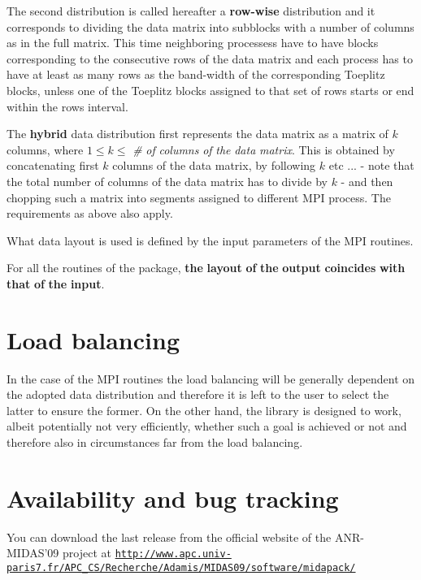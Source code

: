 The second distribution is called hereafter a {\bfseries row-\/wise} distribution and it corresponds to dividing the data matrix into subblocks with a number of columns as in the full matrix. This time neighboring processess have to have blocks corresponding to the consecutive rows of the data matrix and each process has to have at least as many rows as the band-\/width of the corresponding Toeplitz blocks, unless one of the Toeplitz blocks assigned to that set of rows starts or end within the rows interval.

The {\bfseries hybrid} data distribution first represents the data matrix as a matrix of $ k $ columns, where $ 1 \le k \le $ {\itshape \#} {\itshape of} {\itshape columns} {\itshape of} {\itshape the} {\itshape data} {\itshape matrix}. This is obtained by concatenating first $ k $ columns of the data matrix, by following $ k$ etc ... -\/ note that the total number of columns of the data matrix has to divide by $ k$ -\/ and then chopping such a matrix into segments assigned to different M\-P\-I process. The requirements as above also apply.

What data layout is used is defined by the input parameters of the M\-P\-I routines.

For all the routines of the package, {\bfseries the} {\bfseries layout} {\bfseries of} {\bfseries the} {\bfseries output} {\bfseries coincides} {\bfseries with} {\bfseries that} {\bfseries of} {\bfseries the} {\bfseries input}. \hypertarget{toeplitz_loadbalancing}{}\section{Load balancing}\label{toeplitz_loadbalancing}
In the case of the M\-P\-I routines the load balancing will be generally dependent on the adopted data distribution and therefore it is left to the user to select the latter to ensure the former. On the other hand, the library is designed to work, albeit potentially not very efficiently, whether such a goal is achieved or not and therefore also in circumstances far from the load balancing. \hypertarget{toeplitz_avail}{}\section{Availability and bug tracking}\label{toeplitz_avail}
You can download the last release from the official website of the A\-N\-R-\/\-M\-I\-D\-A\-S'09 project at \href{http://www.apc.univ-paris7.fr/APC_CS/Recherche/Adamis/MIDAS09/software/midapack/}{\tt http\-://www.\-apc.\-univ-\/paris7.\-fr/\-A\-P\-C\-\_\-\-C\-S/\-Recherche/\-Adamis/\-M\-I\-D\-A\-S09/software/midapack/}

